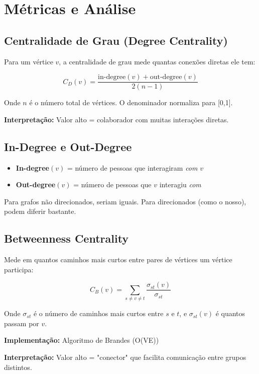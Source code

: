 \documentclass[12pt,a4paper]{article}
\begin{document}
\section{Métricas e Análise}\label{sec:metricas}

\subsection{Centralidade de Grau (Degree Centrality)}

Para um vértice $v$, a centralidade de grau mede quantas conexões diretas ele tem:

\[
C_D(v) = \frac{\text{in-degree}(v) + \text{out-degree}(v)}{2(n-1)}
\]

Onde $n$ é o número total de vértices. O denominador normaliza para [0,1].

\textbf{Interpretação:} Valor alto = colaborador com muitas interações diretas.

\subsection{In-Degree e Out-Degree}

\begin{itemize}
  \item \textbf{In-degree}$(v)$ = número de pessoas que interagiram \textit{com} $v$
  \item \textbf{Out-degree}$(v)$ = número de pessoas que $v$ interagiu \textit{com}
\end{itemize}

Para grafos não direcionados, seriam iguais. Para direcionados (como o nosso), podem diferir bastante.

\subsection{Betweenness Centrality}

Mede em quantos caminhos mais curtos entre pares de vértices um vértice participa:

\[
C_B(v) = \sum_{s \neq v \neq t} \frac{\sigma_{st}(v)}{\sigma_{st}}
\]

Onde $\sigma_{st}$ é o número de caminhos mais curtos entre $s$ e $t$, e $\sigma_{st}(v)$ é quantos passam por $v$.

\textbf{Implementação:} Algoritmo de Brandes (O(VE))

\textbf{Interpretação:} Valor alto = "conector" que facilita comunicação entre grupos distintos.
\end{document}
